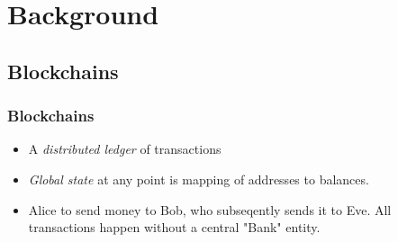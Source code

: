 \documentclass{beamer}
\begin{document}
\section{Background}
\subsection{Blockchains}
\begin{frame}[fragile]
    \frametitle{Blockchains}
  \begin{figure}
    \centering
    \begin{tikzpicture}[shorten >=1pt,on grid, node distance=2.2cm, draw=black!80, auto]
      
    \end{tikzpicture}
  \end{figure}
  \begin{itemize}
    \item A \textit{distributed ledger} of transactions
    \item \textit{Global state} at any point is mapping of addresses to
      balances.
    \item Alice to send money to Bob, who subseqently sends it to Eve.
      All transactions happen without a central "Bank" entity.
  \end{itemize}
\end{frame}
\end{document}
